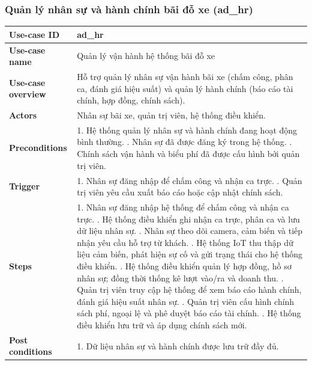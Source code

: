 \subsubsection{Quản lý nhân sự và hành chính bãi đỗ xe (ad\_hr)}
\begingroup
\small
\begin{longtable}{|>{\centering\arraybackslash}m{3cm}|m{13.7cm}|}
\hline
\textbf{Use-case ID} & ad\_hr \\ \hline
\textbf{Use-case name} & Quản lý vận hành hệ thống bãi đỗ xe \\ \hline
\textbf{Use-case overview} & Hỗ trợ quản lý nhân sự vận hành bãi xe (chấm công, phân ca, đánh giá hiệu suất) và quản lý hành chính (báo cáo tài chính, hợp đồng, chính sách). \\ \hline
\textbf{Actors} & Nhân sự bãi xe, quản trị viên, hệ thống điều khiển. \\ \hline
\textbf{Preconditions} & 
1. Hệ thống quản lý nhân sự và hành chính đang hoạt động bình thường. \newline
2. Nhân sự đã được đăng ký trong hệ thống. \newline
3. Chính sách vận hành và biểu phí đã được cấu hình bởi quản trị viên. \\ \hline
\textbf{Trigger} & 
1. Nhân sự đăng nhập để chấm công và nhận ca trực. \newline
2. Quản trị viên yêu cầu xuất báo cáo hoặc cập nhật chính sách. \\ \hline
\textbf{Steps} & 
1. Nhân sự đăng nhập hệ thống để chấm công và nhận ca trực. \newline
2. Hệ thống điều khiển ghi nhận ca trực, phân ca và lưu dữ liệu nhân sự. \newline
3. Nhân sự theo dõi camera, cảm biến và tiếp nhận yêu cầu hỗ trợ từ khách. \newline
4. Hệ thống IoT thu thập dữ liệu cảm biến, phát hiện sự cố và gửi trạng thái cho hệ thống điều khiển. \newline
5. Hệ thống điều khiển quản lý hợp đồng, hồ sơ nhân sự; đồng thời thống kê lượt vào/ra và doanh thu. \newline
6. Quản trị viên truy cập hệ thống để xem báo cáo hành chính, đánh giá hiệu suất nhân sự. \newline
7. Quản trị viên cấu hình chính sách phí, ngoại lệ và phê duyệt báo cáo tài chính. \newline
8. Hệ thống điều khiển lưu trữ và áp dụng chính sách mới. \\ \hline
\textbf{Post conditions} & 
1. Dữ liệu nhân sự và hành chính được lưu trữ đầy đủ. \newline

\end{longtable}
